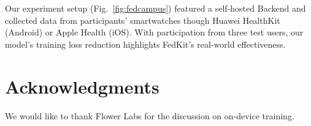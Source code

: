 \documentclass[letterpaper]{article} %
\begin{document}
Our experiment setup (Fig.~\ref{fig:fedcampus}) featured a self-hosted Backend
and collected data from participants' smartwatches
though Huawei HealthKit (Android) or Apple Health (iOS).
With participation from three test users,
our model's training loss reduction highlights
FedKit's real-world effectiveness.

\appendix

\section*{Acknowledgments}
We would like to thank Flower Labs for the discussion on on-device training.

\bigskip


\end{document}
